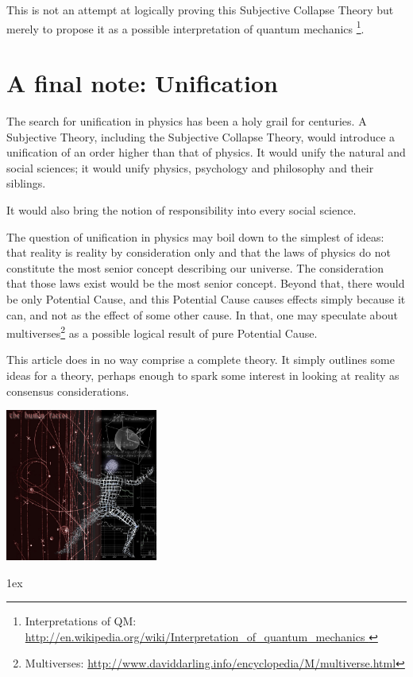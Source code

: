 \documentclass[11pt]{article}
\begin{document}
This is not an attempt at logically proving this Subjective Collapse Theory but
merely to propose it as a possible interpretation of quantum mechanics
\footnote{ Interpretations of QM: \url{http://en.wikipedia.org/wiki/Interpretation\_of\_quantum\_mechanics
}}. 

\newpage
\section{A final note: Unification}

The search for unification in physics has been a holy grail for centuries. A
Subjective Theory, including the Subjective Collapse Theory, would introduce a
unification of an order higher than that of physics. It would unify the natural
and social sciences; it would unify physics, psychology and philosophy and
their siblings.

It would also bring the notion of responsibility into every social science.

The question of unification in physics may boil down to the simplest of ideas:
that reality is reality by consideration only and that the laws of physics do
not constitute the most senior concept describing our universe. The
consideration that those laws exist would be the most senior concept. Beyond
that, there would be only Potential Cause, and this Potential Cause causes
effects simply because it can, and not as the effect of some other cause. In
that, one may speculate about
multiverses\footnote{ Multiverses: \url{http://www.daviddarling.info/encyclopedia/M/multiverse.html}}
as a possible logical result of pure Potential Cause.

This article does in no way comprise a complete theory. It simply outlines some
ideas for a theory, perhaps enough to spark some interest in looking at reality
as consensus considerations.

\vspace{10mm}
\begin{center}
\includegraphics[width=50mm]{humanfactor}
\par\end{center}

\newpage
\begingroup
\parindent 0pt
\parskip 1ex
\def\enotesize{\small}
\theendnotes
\endgroup
\end{document}
